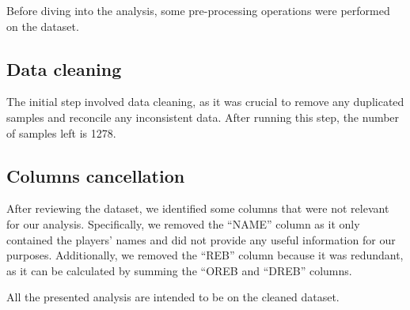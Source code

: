 Before diving into the analysis, some pre-processing operations were performed on the dataset.

\subsection{Data cleaning}
The initial step involved data cleaning, as it was crucial to remove any duplicated samples and reconcile any inconsistent data.
After running this step, the number of samples left is 1278.

\subsection{Columns cancellation}
After reviewing the dataset, we identified some columns that were not relevant for our analysis. Specifically, we removed the ``NAME'' column as it only contained the players' names and did not provide any useful information for our purposes. Additionally, we removed the ``REB'' column because it was redundant, as it can be calculated by summing the ``OREB and ``DREB'' columns.

\noindent
All the presented analysis are intended to be on the cleaned dataset.